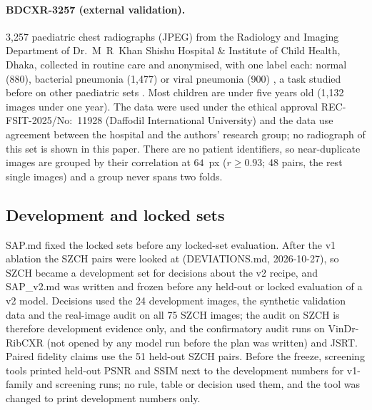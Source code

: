 \paragraph{BDCXR-3257 (external validation).} 3,257 paediatric chest radiographs (JPEG) from the Radiology and Imaging Department of
Dr.~M~R~Khan Shishu Hospital \& Institute of Child Health, Dhaka, collected in routine care and anonymised, with one label each: normal (880),
bacterial pneumonia (1,477) or viral pneumonia (900) \citep{durjoy2026bdcxr}, a task studied before on other paediatric sets \citep{kermany2018identifying}. Most children are under five years old
(1,132 images under one year). The data were used under the ethical approval REC-FSIT-2025/No:~11928 (Daffodil International University) and
the data use agreement between the hospital and the authors' research group; no radiograph of this set is shown in this paper. There are no
patient identifiers, so near-duplicate images are grouped by their correlation at $64$~px ($r\ge0.93$; 48 pairs, the rest single images) and
a group never spans two folds.

\subsection{Development and locked sets}
SAP.md fixed the locked sets before any locked-set evaluation. After the v1 ablation the SZCH pairs were looked at (DEVIATIONS.md, 2026-10-27), so SZCH
became a development set for decisions about the v2 recipe, and SAP\_v2.md was written and frozen before any held-out or locked evaluation of a v2
model. Decisions used the 24 development images, the synthetic validation data and the real-image audit on all 75 SZCH images; the audit on SZCH is
therefore development evidence only, and the confirmatory audit runs on VinDr-RibCXR (not opened by any model run before the plan was written) and
JSRT. Paired fidelity claims use the 51 held-out SZCH pairs. Before the freeze, screening tools printed held-out PSNR and SSIM next to the
development numbers for v1-family and screening runs; no rule, table or decision used them, and the tool was changed to print development
numbers only.

